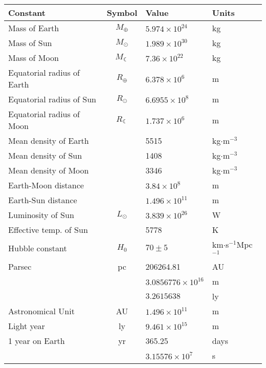 \newpage
\begin{fancybox}{1}
\begin{center}
\begin{tabular}{   l  |  c  |  l  |  l  }
Constant & Symbol & Value & Units \\
\hline
Mass of Earth& $M_\oplus$ & $5.974 \times 10^{24}$ & kg\\
Mass of Sun& $M_\odot$ &$1.989  \times 10^{30}$ & kg\\
Mass of Moon& $M_{\leftmoon}$ &$7.36 \times 10^{22}$&  kg\\
Equatorial radius of Earth& $R_\oplus$ & $6.378 \times 10^6$& m\\
Equatorial radius of Sun& $R_\odot$ &$6.6955 \times 10^8$ & m\\
Equatorial radius of Moon& $R_{\leftmoon}$ &$1.737 \times 10^{6}$ & m\\
Mean density of Earth &  & 5515  & kg$\cdot$m$^{-3}$  \\
Mean density of Sun &  & 1408  & kg$\cdot$m$^{-3}$ \\
Mean density of Moon  & & 3346  & kg$\cdot$m$^{-3}$ \\
Earth-Moon distance& &$3.84 \times 10^8$ & m\\
Earth-Sun distance& &$1.496 \times 10^{11}$ & m \\
Luminosity of Sun & $L_\odot$  & $3.839\times 10^{26}$  & W  \\
Effective temp. of Sun &   & 5778  & K  \\
Hubble constant & $H_0$  & $70\pm 5$  & km$\cdot$s$^{-1}$Mpc$^{-1}$  \\
Parsec& pc & 206264.81 & AU\\
&  & $3.0856776 \times 10^{16}$ & m\\
& & $3.2615638$ & ly \\
Astronomical Unit & AU & $1.496 \times 10^{11}$ & m \\
Light year& ly & $9.461 \times 10^{15}$ & m \\
1 year on Earth& yr & 365.25 & days \\
&  & $3.15576 \times 10^{7}$& s 
\end{tabular}
\end{center}
\end{fancybox}

